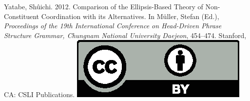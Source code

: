 \documentclass[11pt,a4paper,fleqn]{article}
\begin{document}
\noindent



\vfill
\noindent
Yatabe, Shûichi. 2012. Comparison of the Ellipsis-Based Theory of Non-Constituent Coordination with its Alternatives. In Müller, Stefan (Ed.), \emph{{Proceedings of the 19th International Conference on Head-Driven Phrase Structure Grammar, Chungnam National University Daejeon}}, 454--474. Stanford,
CA: CSLI Publications. \hfill\href{http://creativecommons.org/licenses/by/4.0/}{\includegraphics[height=.75em]{Includes/ccby.eps}}

\newpage

\end{document}
